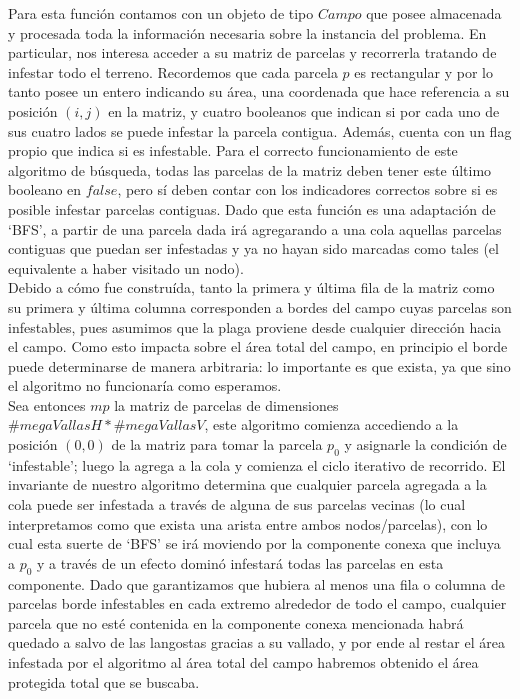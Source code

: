 \indent Para esta función contamos con un objeto de tipo $Campo$ que posee almacenada y procesada toda la información necesaria sobre la instancia del problema. En particular, nos interesa acceder a su matriz de parcelas y recorrerla tratando de infestar todo el terreno. Recordemos que cada parcela $p$ es rectangular y por lo tanto posee un entero indicando su área, una coordenada que hace referencia a su posición $(i,j)$ en la matriz, y cuatro booleanos que indican si por cada uno de sus cuatro lados se puede infestar la parcela contigua. Además, cuenta con un flag propio que indica si es infestable. Para el correcto funcionamiento de este algoritmo de búsqueda, todas las parcelas de la matriz deben tener este último booleano en $false$, pero sí deben contar con los indicadores correctos sobre si es posible infestar parcelas contiguas. Dado que esta función es una adaptación de `BFS', a partir de una parcela dada irá agregarando a una cola aquellas parcelas contiguas que puedan ser infestadas y ya no hayan sido marcadas como tales (el equivalente a haber visitado un nodo).\\
\indent Debido a cómo fue construída, tanto la primera y última fila de la matriz como su primera y última columna corresponden a bordes del campo cuyas parcelas son infestables, pues asumimos que la plaga proviene desde cualquier dirección hacia el campo. Como esto impacta sobre el área total del campo, en principio el borde puede determinarse de manera arbitraria: lo importante es que exista, ya que sino el algoritmo no funcionaría como esperamos.\\
\indent Sea entonces $mp$ la matriz de parcelas de dimensiones $\#megaVallasH*\#megaVallasV$, este algoritmo comienza accediendo a la posición $(0,0)$ de la matriz para tomar la parcela $p_{0}$ y asignarle la condición de `infestable'; luego la agrega a la cola y comienza el ciclo iterativo de recorrido. El invariante de nuestro algoritmo determina que cualquier parcela agregada a la cola puede ser infestada a través de alguna de sus parcelas vecinas (lo cual interpretamos como que exista una arista entre ambos nodos/parcelas), con lo cual esta suerte de `BFS' se irá moviendo por la componente conexa que incluya a $p_{0}$ y a través de un efecto dominó infestará todas las parcelas en esta componente. Dado que garantizamos que hubiera al menos una fila o columna de parcelas borde infestables en cada extremo alrededor de todo el campo, cualquier parcela que no esté contenida en la componente conexa mencionada habrá quedado a salvo de las langostas gracias a su vallado, y por ende al restar el área infestada por el algoritmo al área total del campo habremos obtenido el área protegida total que se buscaba.\\
